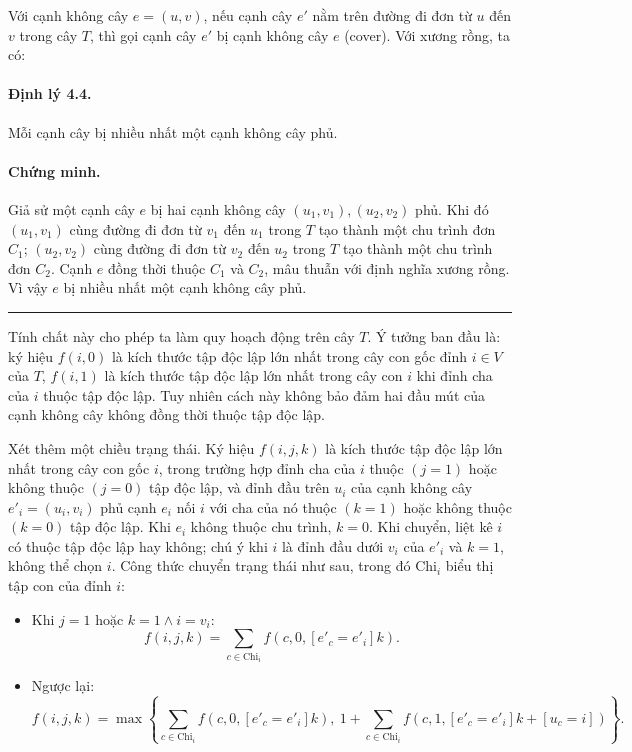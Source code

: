 \documentclass[11pt]{article}
\newcommand{\qedmark}{\hfill\rule{0.7ex}{0.7ex}}
\begin{document}
Với cạnh không cây \(e=(u,v)\), nếu cạnh cây \(e'\) nằm trên đường đi đơn từ
\(u\) đến \(v\) trong cây \(T\), thì gọi cạnh cây \(e'\) bị cạnh không cây
\(e\)  (cover). Với xương rồng, ta có:

\paragraph{Định lý 4.4.}
Mỗi cạnh cây bị nhiều nhất một cạnh không cây phủ.

\paragraph{Chứng minh.}
Giả sử một cạnh cây \(e\) bị hai cạnh không cây \((u_1,v_1),(u_2,v_2)\) phủ.
Khi đó \((u_1,v_1)\) cùng đường đi đơn từ \(v_1\) đến \(u_1\) trong \(T\) tạo
thành một chu trình đơn \(C_1\); \((u_2,v_2)\) cùng đường đi đơn từ \(v_2\) đến
\(u_2\) trong \(T\) tạo thành một chu trình đơn \(C_2\). Cạnh \(e\) đồng thời
thuộc \(C_1\) và \(C_2\), mâu thuẫn với định nghĩa xương rồng. Vì vậy \(e\) bị
nhiều nhất một cạnh không cây phủ. \qedmark

Tính chất này cho phép ta làm quy hoạch động trên cây \(T\). Ý tưởng ban đầu
là: ký hiệu \(f(i,0)\) là kích thước tập độc lập lớn nhất trong cây con gốc
đỉnh \(i\in V\) của \(T\), \(f(i,1)\) là kích thước tập độc lập lớn nhất trong
cây con \(i\) khi đỉnh cha của \(i\) thuộc tập độc lập. Tuy nhiên cách này
không bảo đảm hai đầu mút của cạnh không cây không đồng thời thuộc tập độc lập.

Xét thêm một chiều trạng thái. Ký hiệu \(f(i,j,k)\) là kích thước tập độc lập
lớn nhất trong cây con gốc \(i\), trong trường hợp đỉnh cha của \(i\) thuộc
\((j=1)\) hoặc không thuộc \((j=0)\) tập độc lập, và đỉnh đầu trên \(u_i\) của
cạnh không cây \(e'_i=(u_i,v_i)\) phủ cạnh \(e_i\) nối \(i\) với cha của nó
thuộc \((k=1)\) hoặc không thuộc \((k=0)\) tập độc lập. Khi \(e_i\) không thuộc
chu trình, \(k=0\). Khi chuyển, liệt kê \(i\) có thuộc tập độc lập hay không;
chú ý khi \(i\) là đỉnh đầu dưới \(v_i\) của \(e'_i\) và \(k=1\), không thể
chọn \(i\). Công thức chuyển trạng thái như sau, trong đó \(\mathrm{Chi}_i\)
biểu thị tập con của đỉnh \(i\):

\begin{itemize}
  \item Khi \(j=1\) hoặc \(k=1\wedge i=v_i\):
  \[
    f(i,j,k)=\sum_{c\in\mathrm{Chi}_i} f(c,0,[e'_c=e'_i]k).
  \]

  \item Ngược lại:
  \[
    f(i,j,k)=\max\left\{
      \sum_{c\in\mathrm{Chi}_i} f(c,0,[e'_c=e'_i]k),\
      1+\sum_{c\in\mathrm{Chi}_i} f(c,1,[e'_c=e'_i]k+[u_c=i])
    \right\}.
  \]
\end{itemize}
\end{document}
